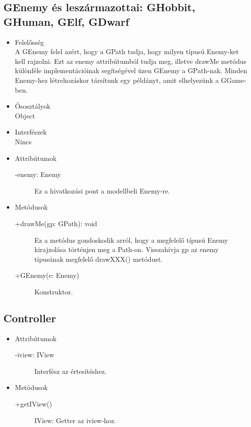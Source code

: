 \subsection{GEnemy és leszármazottai: GHobbit, GHuman, GElf, GDwarf}
\begin{itemize}
\item Felelősség\\
A GEnemy felel azért, hogy a GPath tudja, hogy milyen típusú Enemy-ket kell rajzolni. Ezt az enemy attribútumból tudja meg, illetve drawMe metódus különféle implementációinak segítségével üzen GEnemy a GPath-nak. Minden Enemy-hez létrehozáskor társítunk egy példányt, amit elhelyezünk a GGame-ben.
\item Ősosztályok\\
Object
\item Interfészek\\
Nincs
\item Attribútumok
	\begin{description}
		\item[-enemy: Enemy] Ez a hivatkozási pont a modellbeli Enemy-re.
\end{description}
\item Metódusok
	\begin{description}
		\item[+drawMe(gp: GPath): void] Ez a metódus gondoskodik arról, hogy a megfelelő típusú Enemy kirajzolása történjen meg a Path-on. Visszahívja gp az enemy típusának megfelelő drawXXX() metódust.
		\item[+GEnemy(e: Enemy)] Konstruktor.
	\end{description}
\end{itemize}

\subsection{Controller}
\begin{itemize}
\item Attribútumok
	\begin{description}
		\item[-iview: IView] Interfész az értesítéshez.
\end{description}
\item Metódusok
	\begin{description}
		\item[+getIView()] IView: Getter az iview-hoz.
	\end{description}
\end{itemize}

